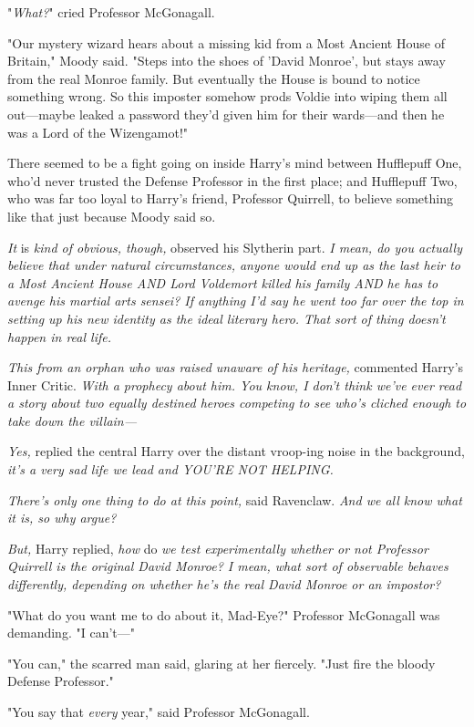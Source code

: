 "\emph{What?}" cried Professor McGonagall.

"Our mystery wizard hears about a missing kid from a Most Ancient House of Britain," Moody said. "Steps into the shoes of 'David Monroe', but stays away from the real Monroe family. But eventually the House is bound to notice something wrong. So this imposter somehow prods Voldie into wiping them all out---maybe leaked a password they'd given him for their wards---and then he was a Lord of the Wizengamot!"

There seemed to be a fight going on inside Harry's mind between Hufflepuff One, who'd never trusted the Defense Professor in the first place; and Hufflepuff Two, who was far too loyal to Harry's friend, Professor Quirrell, to believe something like that just because Moody said so.

\emph{It} is\emph{ kind of obvious, though,} observed his Slytherin part. \emph{I mean, do you actually believe that under natural circumstances, anyone would end up as the last heir to a Most Ancient House AND Lord Voldemort killed his family AND he has to avenge his martial arts sensei? If anything I'd say he went too far over the top in setting up his new identity as the ideal literary hero. That sort of thing doesn't happen in real life.} 

\emph{This from an orphan who was raised unaware of his heritage,} commented Harry's Inner Critic. \emph{With a prophecy about him. You know, I don't think we've ever read a story about two equally destined heroes competing to see who's cliched enough to take down the villain---}

\emph{Yes,} replied the central Harry over the distant vroop-ing noise in the background, \emph{it's a very sad life we lead and YOU'RE NOT HELPING.}

\emph{There's only one thing to do at this point,} said Ravenclaw. \emph{And we all know what it is, so why argue?}

\emph{But,} Harry replied, \emph{how} do\emph{ we test experimentally whether or not Professor Quirrell is the original David Monroe? I mean, what sort of observable behaves differently, depending on whether he's the real David Monroe or an impostor?}

"What do you want me to do about it, Mad-Eye?" Professor McGonagall was demanding. "I can't---"

"You can," the scarred man said, glaring at her fiercely. "Just fire the bloody Defense Professor."

"You say that \emph{every} year," said Professor McGonagall.

